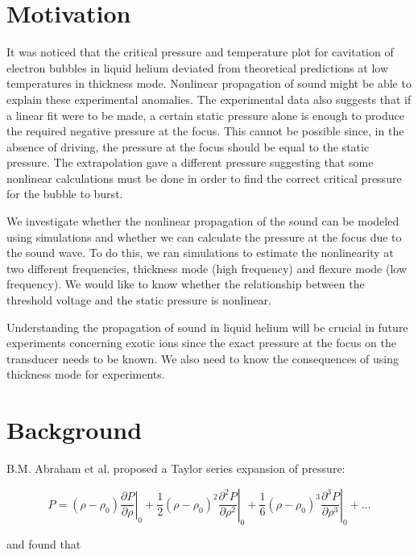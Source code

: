 \section{Motivation}
It was noticed that the critical pressure and temperature plot for cavitation of electron bubbles in liquid helium deviated from theoretical predictions at low temperatures in thickness mode. Nonlinear propagation of sound might be able to explain these experimental anomalies. The experimental data also suggests that if a linear fit were to be made, a certain static pressure alone is enough to produce the required negative pressure at the focus. This cannot be possible since, in the absence of driving, the pressure at the focus should be equal to the static pressure. The extrapolation gave a different pressure suggesting that some nonlinear calculations must be done in order to find the correct critical pressure for the bubble to burst.

We investigate whether the nonlinear propagation of the sound can be modeled using simulations and whether we can calculate the pressure at the focus due to the sound wave. To do this, we ran simulations to estimate the nonlinearity at two different frequencies, thickness mode (high frequency) and flexure mode (low frequency). We would like to know whether the relationship between the threshold voltage and the static pressure is nonlinear.

Understanding the propagation of sound in liquid helium will be crucial in future experiments concerning exotic ions since the exact pressure at the focus on the transducer needs to be known. We also need to know the consequences of using thickness mode for experiments.

\section{Background}

B.M. Abraham et al. proposed a Taylor series expansion of pressure: \cite{PhysRevA.2.550.3}

\begin{equation}\label{preseq1}
P = (\rho - \rho_0) \left.\frac{\partial P}{\partial \rho}\right|_0 + \frac{1}{2}(\rho - \rho_0)^2 \left.\frac{\partial^2 P}{\partial \rho^2}\right|_0 + \frac{1}{6}(\rho - \rho_0)^3 \left.\frac{\partial^3 P}{\partial \rho^3}\right|_0 + ...
\end{equation}

and found that\\

